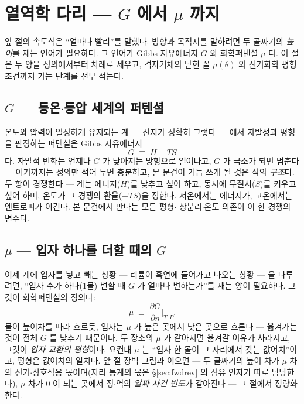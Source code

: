 \documentclass[11pt,a4paper]{article}
\begin{document}
\section{열역학 다리 — $G$ 에서 $\mu$ 까지}\label{sec:thermo}
앞 절의 속도식은 ``얼마나 빨리''를 말했다. 방향과 목적지를 말하려면 두 골짜기의 \emph{높이}를 재는 언어가
필요하다. 그 언어가 Gibbs 자유에너지 $G$ 와 화학퍼텐셜 $\mu$ 다. 이 절은 두 양을 정의에서부터 차례로
세우고, 격자기체의 닫힌 꼴 $\mu(\theta)$ 와 전기화학 평형 조건까지 가는 단계를 전부 적는다.

\subsection{$G$ — 등온$\cdot$등압 세계의 퍼텐셜}
온도와 압력이 일정하게 유지되는 계 — 전지가 정확히 그렇다 — 에서 자발성과 평형을 판정하는 퍼텐셜은
Gibbs 자유에너지
\begin{equation}
G\;\equiv\;H-TS
\label{eq:gibbsdef}
\end{equation}
다. 자발적 변화는 언제나 $G$ 가 낮아지는 방향으로 일어나고, $G$ 가 극소가 되면 멈춘다 — 여기까지는
정의만 적어 두면 충분하고, 본 문건이 거듭 쓰게 될 것은 식의 \emph{구조}다. 두 항이 경쟁한다 — 계는
에너지($H$)를 낮추고 싶어 하고, 동시에 무질서($S$)를 키우고 싶어 하며, 온도가 그 경쟁의
환율($-TS$)을 정한다. 저온에서는 에너지가, 고온에서는 엔트로피가 이긴다. 본 문건에서 만나는 모든 평형$\cdot$
상분리$\cdot$온도 의존이 이 한 경쟁의 변주다.

\subsection{$\mu$ — 입자 하나를 더할 때의 $G$}
이제 계에 입자를 넣고 빼는 상황 — 리튬이 흑연에 들어가고 나오는 상황 — 을 다루려면, ``입자 수가 하나(1몰)
변할 때 $G$ 가 얼마나 변하는가''를 재는 양이 필요하다. 그것이 화학퍼텐셜의 정의다:
\begin{equation}
\mu\;\equiv\;\frac{\partial G}{\partial n}\Big|_{T,P}.
\label{eq:mudef}
\end{equation}
물이 높이차를 따라 흐르듯, 입자는 $\mu$ 가 높은 곳에서 낮은 곳으로 흐른다 — 옮겨가는 것이 전체 $G$ 를
낮추기 때문이다. 두 장소의 $\mu$ 가 같아지면 옮겨갈 이유가 사라지고, 그것이 \emph{입자 교환의 평형}이다.
요컨대 $\mu$ 는 ``입자 한 몰이 그 자리에서 갖는 값어치''이고, 평형은 값어치의 일치다. 앞 절 장벽 그림과
이으면 — 두 골짜기의 높이 차가 $\mu$ 차의 전기$\cdot$상호작용 몫이며(자리 통계의 몫은
\S\ref{sec:fwdrev} 의 점유 인자가 따로 담당한다), $\mu$ 차가 $0$ 이 되는 곳에서 정$\cdot$역의
\emph{알짜 사건 빈도}가 같아진다 — 그 절에서 정량화한다.
\end{document}
